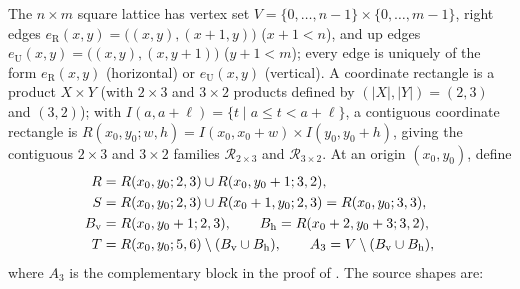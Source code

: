 \begin{definition}
    \leanok
    The $n\times m$ square lattice has vertex set
    $V=\{0,\ldots,n-1\}\times\{0,\ldots,m-1\}$, right edges
    $e_{\mathrm R}(x,y)=\bigl((x,y),(x+1,y)\bigr)$ ($x+1<n$), and up edges
    $e_{\mathrm U}(x,y)=\bigl((x,y),(x,y+1)\bigr)$ ($y+1<m$); every edge is
    uniquely of the form $e_{\mathrm R}(x,y)$ (horizontal) or
    $e_{\mathrm U}(x,y)$ (vertical). A coordinate rectangle is a product
    $X\times Y$ (with $2\times 3$ and $3\times 2$ products defined by
    $(|X|,|Y|)=(2,3)$ and $(3,2)$); with
    $I(a,a+\ell)=\{t\mid a\le t<a+\ell\}$, a contiguous coordinate rectangle is
    $R(x_0,y_0;w,h)=I(x_0,x_0+w)\times I(y_0,y_0+h)$, giving the contiguous
    $2\times 3$ and $3\times 2$ families $\mathcal R_{2\times 3}$ and
    $\mathcal R_{3\times 2}$. At an origin $(x_0,y_0)$, define
    \begin{align}
        R             & = R(x_0,y_0;2,3)\cup R(x_0,y_0+1;3,2), \notag                     \\
        S             & = R(x_0,y_0;2,3)\cup R(x_0+1,y_0;2,3)=R(x_0,y_0;3,3), \notag      \\
        B_{\mathrm v} & = R(x_0,y_0+1;2,3),\qquad
        B_{\mathrm h}=R(x_0+2,y_0+3;3,2), \notag                                          \\
        T             & = R(x_0,y_0;5,6)\setminus(B_{\mathrm v}\cup B_{\mathrm h}),\qquad
        A_3 = V\setminus(B_{\mathrm v}\cup B_{\mathrm h}), \notag
    \end{align}
    where $A_3$ is the complementary block in the proof of
    \cite[Theorem~3]{Molnar2018NormalPEPS}.
    The source shapes are:
    \begin{tenkzequation}
        \tenkzkernel
        \begin{tenkz}[rows={ket,ket,ket,ket,ket}, cols=5,
                west=open, east=open, north=open, south=open]

\end{tenkz}
\end{tenkzequation}
\end{definition}
